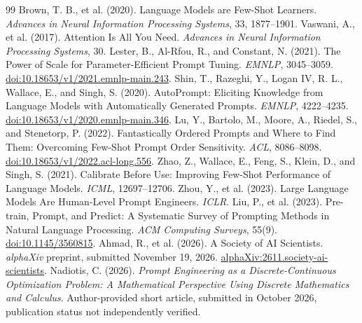 \documentclass[12pt,a4paper,oneside]{report}
\begin{document}
\begin{thebibliography}{99}
 Brown, T. B., et al. (2020). Language Models are Few-Shot Learners. \emph{Advances in Neural Information Processing Systems}, 33, 1877--1901.
 Vaswani, A., et al. (2017). Attention Is All You Need. \emph{Advances in Neural Information Processing Systems}, 30.
 Lester, B., Al-Rfou, R., and Constant, N. (2021). The Power of Scale for Parameter-Efficient Prompt Tuning. \emph{EMNLP}, 3045--3059. \href{https://doi.org/10.18653/v1/2021.emnlp-main.243}{doi:10.18653/v1/2021.emnlp-main.243}.
 Shin, T., Razeghi, Y., Logan IV, R. L., Wallace, E., and Singh, S. (2020). AutoPrompt: Eliciting Knowledge from Language Models with Automatically Generated Prompts. \emph{EMNLP}, 4222--4235. \href{https://doi.org/10.18653/v1/2020.emnlp-main.346}{doi:10.18653/v1/2020.emnlp-main.346}.
 Lu, Y., Bartolo, M., Moore, A., Riedel, S., and Stenetorp, P. (2022). Fantastically Ordered Prompts and Where to Find Them: Overcoming Few-Shot Prompt Order Sensitivity. \emph{ACL}, 8086--8098. \href{https://doi.org/10.18653/v1/2022.acl-long.556}{doi:10.18653/v1/2022.acl-long.556}.
 Zhao, Z., Wallace, E., Feng, S., Klein, D., and Singh, S. (2021). Calibrate Before Use: Improving Few-Shot Performance of Language Models. \emph{ICML}, 12697--12706.
 Zhou, Y., et al. (2023). Large Language Models Are Human-Level Prompt Engineers. \emph{ICLR}.
 Liu, P., et al. (2023). Pre-train, Prompt, and Predict: A Systematic Survey of Prompting Methods in Natural Language Processing. \emph{ACM Computing Surveys}, 55(9). \href{https://doi.org/10.1145/3560815}{doi:10.1145/3560815}.
 Ahmad, R., et al. (2026). A Society of AI Scientists. \emph{alphaXiv} preprint, submitted November 19, 2026. \href{https://www.alphaxiv.org/abs/2611.society-ai-scientists}{alphaXiv:2611.society-ai-scientists}.
 Nadiotis, C. (2026). \emph{Prompt Engineering as a Discrete-Continuous Optimization Problem: A Mathematical Perspective Using Discrete Mathematics and Calculus}. Author-provided short article, submitted in October 2026, publication status not independently verified.
\end{thebibliography}
\end{document}
